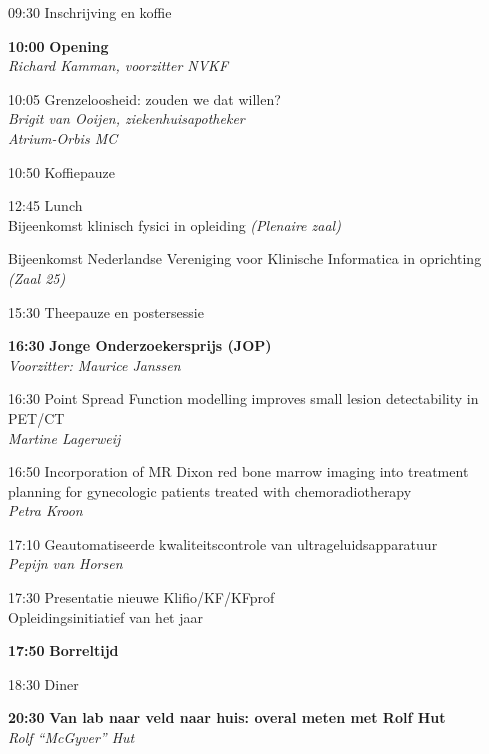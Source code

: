 \documentclass[a4paper,10pt]{report}
\begin{document}
\begin{multicols*}{3}

\begin{packed_enum}
    \item[09:30] Inschrijving en koffie
        \vfill
    \item[\textbf{10:00}] \textbf{Opening}\\\textit{Richard Kamman, voorzitter NVKF}
        \vfill
    \item[10:05] Grenzeloosheid: zouden we dat willen?\\\textit{Brigit van Ooijen, ziekenhuisapotheker\\Atrium-Orbis MC}
        \vfill
    \item[10:50] Koffiepauze
        \vfill
    \item[{\color{Blue}{\textbf{11:20}}}] {}
        \vfill
    \item[12:45] Lunch\\
        {\small Bijeenkomst klinisch fysici in opleiding \hfill\textit{(Plenaire zaal)}}\\
        {\small Bijeenkomst Nederlandse Vereniging voor Klinische Informatica
        in oprichting \hfill\textit{(Zaal 25)}\strut}
        \vfill
    \item[{\color{Blue}{\textbf{14:00}}}] {}
        \vfill
    \item[15:30] Theepauze en postersessie 
        \vfill
    \item[\textbf{16:30}] {\textbf{Jonge Onderzoekersprijs (JOP)}}\\\textit{Voorzitter: Maurice Janssen}
    \item[16:30] Point Spread Function modelling improves small lesion detectability in PET/CT\\\textit{Martine Lagerweij}
    \item[16:50] Incorporation of MR Dixon red bone marrow imaging into treatment planning for gynecologic patients treated with chemoradiotherapy\\\textit{Petra Kroon}
    \item[17:10] Geautomatiseerde kwaliteitscontrole van ultrageluidsapparatuur\\\textit{Pepijn van Horsen}
        \vfill
    \item[17:30] Presentatie nieuwe Klifio/KF/KFprof\\Opleidingsinitiatief van het jaar
        \vfill
    \item[\textbf{17:50}] {\textbf{Borreltijd}}
        \vfill
    \item[18:30] Diner
        \vfill
    \item[\textbf{20:30}] {\textbf{Van lab naar veld naar huis: overal meten
        met Rolf Hut}}\\\textit{Rolf ``McGyver'' Hut}
\end{packed_enum}


\end{multicols*}
\end{document}
